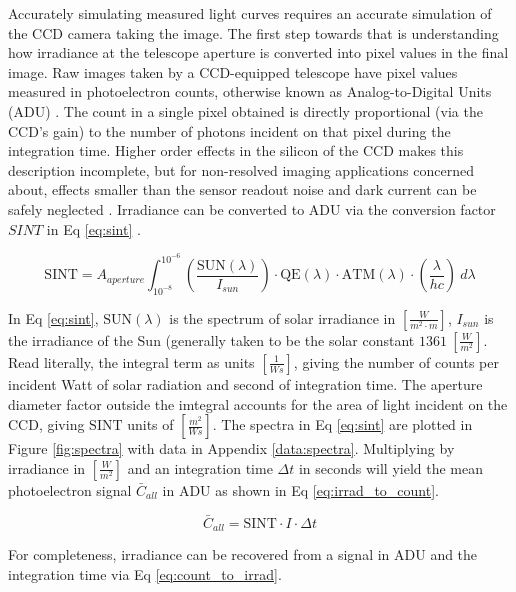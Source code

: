 Accurately simulating measured light curves requires an accurate simulation of the CCD camera taking the image. The first step towards that is understanding how irradiance at the telescope aperture is converted into pixel values in the final image. Raw images taken by a CCD-equipped telescope have pixel values measured in photoelectron counts, otherwise known as Analog-to-Digital Units (ADU) \cite{krag2003}. The count in a single
pixel obtained is directly proportional (via the CCD's gain) to the number of
photons incident on that pixel during the integration time. Higher order effects in the silicon of
the CCD makes this description incomplete, but for non-resolved imaging applications
concerned about, effects smaller than the sensor readout noise and dark current can be safely neglected
\cite{frueh2019notes}. Irradiance can be converted to ADU via the conversion factor $SINT$
in Eq \ref{eq:sint} \cite{krag2003}.

\begin{equation} \label{eq:sint}
 \textrm{SINT} = A_{aperture}
	\int_{10^{-8}}^{10^{-6}}{ \left( \frac{\textrm{SUN}(\lambda)}{I_{sun}} \right) \cdot \textrm{QE}(\lambda) \cdot \textrm{ATM}(\lambda)
  \cdot \left( \frac{\lambda}{h c} \right) \: d\lambda}  
\end{equation}

In Eq \ref{eq:sint}, $\textrm{SUN}(\lambda)$ is the spectrum of solar irradiance in 
$\left[\frac{W}{m^2\cdot m} \right]$, $I_{sun}$ is the irradiance of the Sun (generally taken to be
the solar constant $1361 \: \left[ \frac{W}{m^2} \right]$. Read literally, the integral term as
units $\left[ \frac{1}{Ws} \right]$, giving the number of counts per incident Watt of solar
radiation and second of integration time. The aperture diameter factor outside the imtegral accounts
for the area of light incident on the CCD, giving $\textrm{SINT}$ units of $\left[ \frac{m^2}{Ws}
\right]$. The spectra in Eq \ref{eq:sint} are plotted in Figure \ref{fig:spectra} with data in Appendix \ref{data:spectra}. Multiplying by irradiance in $\left[ \frac{W}{m^2} \right]$ and an integration time $\Delta t$ 
in seconds will yield the mean photoelectron signal $\bar{C}_{all}$ in ADU as shown in Eq \ref{eq:irrad_to_count}.

\begin{equation} \label{eq:irrad_to_count}
  \bar{C}_{all} = \textrm{SINT} \cdot I \cdot \Delta t
\end{equation}

For completeness, irradiance can be recovered from a signal in ADU and the integration time via Eq
\ref{eq:count_to_irrad}.

